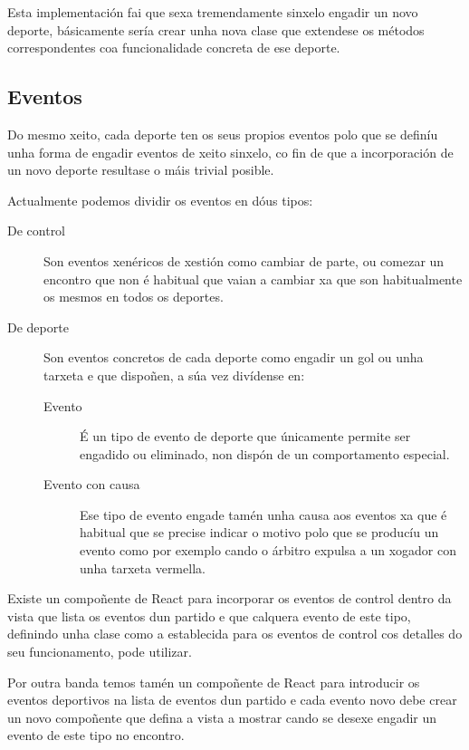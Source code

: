   Esta implementación fai que sexa tremendamente sinxelo engadir un novo 
deporte, básicamente sería crear unha nova clase que extendese os métodos 
correspondentes coa funcionalidade concreta de ese deporte.

  \subsection{Eventos}
  Do mesmo xeito, cada deporte ten os seus propios eventos polo que se definíu 
unha forma de engadir eventos de xeito sinxelo, co fin de que a incorporación 
de un novo deporte resultase o máis trivial posible.

  Actualmente podemos dividir os eventos en dóus tipos:

  \begin{description}
    \item [De control] Son eventos xenéricos de xestión como cambiar de parte, 
ou comezar un encontro que non é habitual que vaian a cambiar xa que son 
habitualmente os mesmos en todos os deportes.
    \item [De deporte] Son eventos concretos de cada deporte como engadir un gol 
ou unha tarxeta e que dispoñen, a súa vez divídense en:
      \begin{description}
       \item [Evento] É un tipo de evento de deporte que únicamente permite ser 
engadido ou eliminado, non dispón de un comportamento especial.
       \item [Evento con causa] Ese tipo de evento engade tamén unha causa aos 
eventos xa que é habitual que se precise indicar o motivo polo que se producíu 
un evento como por exemplo cando o árbitro expulsa a un xogador con unha 
tarxeta vermella.
      \end{description}

  \end{description}

  Existe un compoñente de React para incorporar os eventos de control dentro 
da vista que lista os eventos dun partido e que calquera evento de este tipo, 
definindo unha clase como a establecida para os eventos de control cos detalles 
do seu funcionamento, pode utilizar.

  Por outra banda temos tamén un compoñente de React para introducir os eventos 
deportivos na lista de eventos dun partido e cada evento novo debe crear un 
novo compoñente que defina a vista a mostrar cando se desexe engadir un evento 
de este tipo no encontro.

